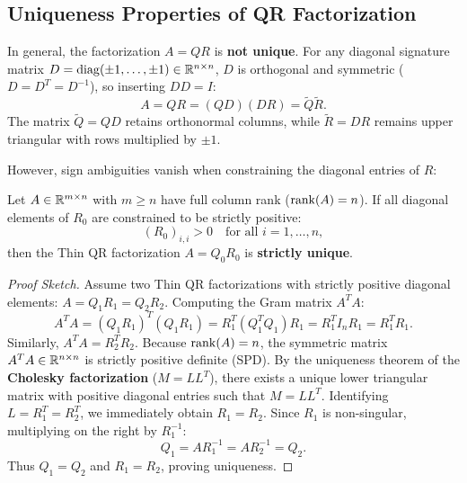 \subsection{Uniqueness Properties of QR Factorization}
In general, the factorization $A = QR$ is \textbf{not unique}.
For any diagonal signature matrix $D = \operatorname{diag}(\pm 1, \dots, \pm 1) \in \mathbb{R}^{n \times n}$, $D$ is orthogonal and symmetric ($D = D^T = D^{-1}$), so inserting $D D = I$:
\begin{equation}
    A = Q R = (Q D) (D R) = \tilde{Q} \tilde{R}.
\end{equation}
The matrix $\tilde{Q} = Q D$ retains orthonormal columns, while $\tilde{R} = D R$ remains upper triangular with rows multiplied by $\pm 1$.

However, sign ambiguities vanish when constraining the diagonal entries of $R$:

\begin{theorem}
\label{thm:qr-conditional-uniqueness-en}
Let $A \in \mathbb{R}^{m \times n}$ with $m \ge n$ have full column rank ($\operatorname{rank}(A) = n$).
If all diagonal elements of $R_0$ are constrained to be strictly positive:
\begin{equation}
    (R_0)_{i,i} > 0 \quad \text{for all } i = 1, \dots, n,
\end{equation}
then the Thin QR factorization $A = Q_0 R_0$ is \textbf{strictly unique}.
\end{theorem}

\begin{proof}[Proof Sketch]
Assume two Thin QR factorizations with strictly positive diagonal elements: $A = Q_1 R_1 = Q_2 R_2$.
Computing the Gram matrix $A^T A$:
\begin{equation}
    A^T A = (Q_1 R_1)^T (Q_1 R_1) = R_1^T (Q_1^T Q_1) R_1 = R_1^T I_n R_1 = R_1^T R_1.
\end{equation}
Similarly, $A^T A = R_2^T R_2$.
Because $\operatorname{rank}(A) = n$, the symmetric matrix $A^T A \in \mathbb{R}^{n \times n}$ is strictly positive definite (SPD). By the uniqueness theorem of the \textbf{Cholesky factorization} ($M = L L^T$), there exists a unique lower triangular matrix with positive diagonal entries such that $M = L L^T$.
Identifying $L = R_1^T = R_2^T$, we immediately obtain $R_1 = R_2$.
Since $R_1$ is non-singular, multiplying on the right by $R_1^{-1}$:
\begin{equation}
    Q_1 = A R_1^{-1} = A R_2^{-1} = Q_2.
\end{equation}
Thus $Q_1 = Q_2$ and $R_1 = R_2$, proving uniqueness.
\end{proof}

